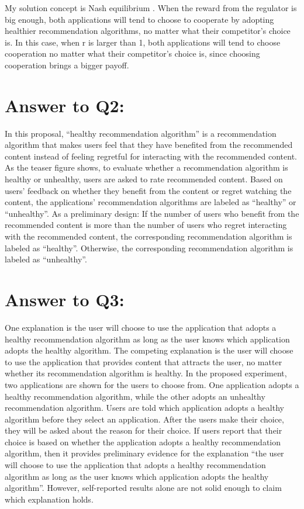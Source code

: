 My solution concept is Nash equilibrium \cite{nash1950}. When the reward from the regulator is big enough, both applications will tend to choose to cooperate by adopting healthier recommendation algorithms, no matter what their competitor’s choice is. In this case, when r is larger than 1, both applications will tend to choose cooperation no matter what their competitor’s choice is, since choosing cooperation brings a bigger payoff.

\section{Answer to Q2:}
In this proposal, “healthy recommendation algorithm” is a recommendation algorithm that makes users feel that they have benefited from the recommended content instead of feeling regretful for interacting with the recommended content. As the teaser figure shows, to evaluate whether a recommendation algorithm is healthy or unhealthy, users are asked to rate recommended content. Based on users’ feedback on whether they benefit from the content or regret watching the content, the applications’ recommendation algorithms are labeled as “healthy” or “unhealthy”. As a preliminary design: If the number of users who benefit from the recommended content is more than the number of users who regret interacting with the recommended content, the corresponding recommendation algorithm is labeled as “healthy”. Otherwise, the corresponding recommendation algorithm is labeled as “unhealthy”.


\balance
\section{Answer to Q3:}
One explanation is the user will choose to use the application that adopts a healthy recommendation algorithm as long as the user knows which application adopts the healthy algorithm. The competing explanation is the user will choose to use the application that provides content that attracts the user, no matter whether its recommendation algorithm is healthy. In the proposed experiment, two applications are shown for the users to choose from. One application adopts a healthy recommendation algorithm, while the other adopts an unhealthy recommendation algorithm. Users are told which application adopts a healthy algorithm before they select an application. After the users make their choice, they will be asked about the reason for their choice. If users report that their choice is based on whether the application adopts a healthy recommendation algorithm, then it provides preliminary evidence for the explanation “the user will choose to use the application that adopts a healthy recommendation algorithm as long as the user knows which application adopts the healthy algorithm”. However, self-reported results alone are not solid enough to claim which explanation holds.

